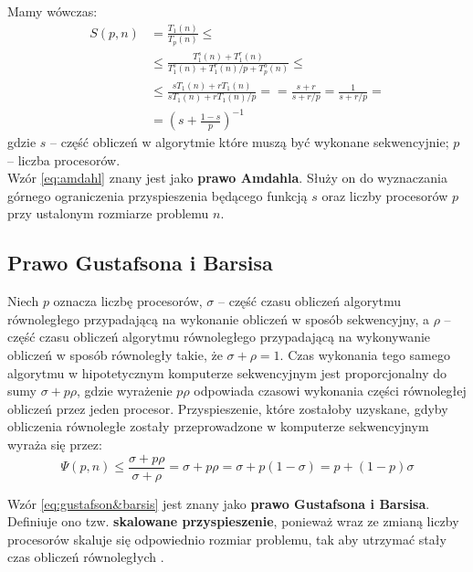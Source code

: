 \documentclass[a4paper,oneside,leqno,12pt]{book}
\theoremstyle{definition}
\theoremstyle{plain}
\theoremstyle{remark}
\begin{document}
Mamy wówczas:
\begin{equation}\label{eq:amdahl}
\begin{split}
S(p, n) &= \frac{T_{1}(n)}{T_{p}(n)}\leq\\
&\leq \frac{T^{s}_{1}(n) + T^{r}_{1}(n)}{T^{s}_{1}(n) + T^{r}_{1}(n)/p + T^{o}_{p}(n)}\leq\\
&\leq \frac{sT_{1}(n) + rT_{1}(n)}{sT_{1}(n) + rT_{1}(n)/p} =
= \frac{s+r}{s+r/p} = \frac{1}{s+r/p}= \\
&= \left(s+\frac{1-s}{p}\right)^{-1}
\end{split}
\end{equation}
gdzie \(s\) – część obliczeń w algorytmie które muszą być wykonane sekwencyjnie; \(p\) – liczba procesorów.\\

Wzór \eqref{eq:amdahl} znany jest jako \textbf{prawo Amdahla}. Służy on do wyznaczania górnego ograniczenia przyspieszenia będącego funkcją \(s\) oraz liczby procesorów \(p\) przy ustalonym rozmiarze problemu \(n\).


\subsection{Prawo Gustafsona i Barsisa}

Niech \(p\) oznacza liczbę procesorów, \(\sigma\) -- część czasu obliczeń algorytmu równoległego przypadającą na wykonanie obliczeń w sposób sekwencyjny, a \(\rho\) -- część czasu obliczeń algorytmu równoległego przypadającą na wykonywanie obliczeń w sposób równoległy takie, że \(\sigma+\rho=1\). Czas wykonania tego samego algorytmu w hipotetycznym komputerze sekwencyjnym jest proporcjonalny do sumy \(\sigma + p\rho\), gdzie wyrażenie \(p\rho\) odpowiada czasowi wykonania części równoległej obliczeń przez jeden procesor. Przyspieszenie, które zostałoby uzyskane, gdyby obliczenia równoległe zostały przeprowadzone w komputerze sekwencyjnym wyraża się przez:
\begin{equation}\label{eq:gustafson&barsis}
\Psi(p,n)\leq\frac{\sigma+p\rho}{\sigma+\rho}=\sigma+p\rho=\sigma+p\left(1-\sigma\right)=p+\left(1-p\right)\sigma
\end{equation}

Wzór \eqref{eq:gustafson&barsis} jest znany jako \textbf{prawo Gustafsona i Barsisa}. Definiuje ono tzw. \textbf{skalowane przyspieszenie}, ponieważ wraz ze zmianą liczby procesorów skaluje się odpowiednio rozmiar problemu, tak aby utrzymać stały czas obliczeń równoległych \cite{Czech}.
\end{document}
